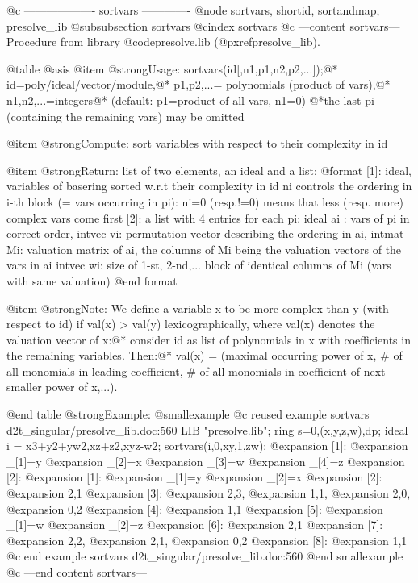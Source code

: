 @c ------------------- sortvars -------------
@node sortvars, shortid, sortandmap, presolve_lib
@subsubsection sortvars
@cindex sortvars
@c ---content sortvars---
Procedure from library @code{presolve.lib} (@pxref{presolve_lib}).

@table @asis
@item @strong{Usage:}
sortvars(id[,n1,p1,n2,p2,...]);@*
id=poly/ideal/vector/module,@*
p1,p2,...= polynomials (product of vars),@*
n1,n2,...=integers@*
(default: p1=product of all vars, n1=0)
@*the last pi (containing the remaining vars) may be omitted

@item @strong{Compute:}
sort variables with respect to their complexity in id

@item @strong{Return:}
list of two elements, an ideal and a list:
  @format
  [1]: ideal, variables of basering sorted w.r.t their complexity in id
       ni controls the ordering in i-th block (= vars occurring in pi):
       ni=0 (resp.!=0) means that less (resp. more) complex vars come first
  [2]: a list with 4 entries for each pi:
       ideal ai : vars of pi in correct order,
       intvec vi: permutation vector describing the ordering in ai,
       intmat Mi: valuation matrix of ai, the columns of Mi being the
                  valuation vectors of the vars in ai
       intvec wi: size of 1-st, 2-nd,... block of identical columns of Mi
                  (vars with same valuation)
  @end format

@item @strong{Note:}
We define a variable x to be more complex than y (with respect to id)
if val(x) > val(y) lexicographically, where val(x) denotes the
valuation vector of x:@*
consider id as list of polynomials in x with coefficients in the
remaining variables. Then:@*
val(x) = (maximal occurring power of x, # of all monomials in leading
coefficient, # of all monomials in coefficient of next smaller power
of x,...).

@end table
@strong{Example:}
@smallexample
@c reused example sortvars d2t_singular/presolve_lib.doc:560 
LIB "presolve.lib";
ring s=0,(x,y,z,w),dp;
ideal i = x3+y2+yw2,xz+z2,xyz-w2;
sortvars(i,0,xy,1,zw);
@expansion{} [1]:
@expansion{}    _[1]=y
@expansion{}    _[2]=x
@expansion{}    _[3]=w
@expansion{}    _[4]=z
@expansion{} [2]:
@expansion{}    [1]:
@expansion{}       _[1]=y
@expansion{}       _[2]=x
@expansion{}    [2]:
@expansion{}       2,1
@expansion{}    [3]:
@expansion{}       2,3,
@expansion{}       1,1,
@expansion{}       2,0,
@expansion{}       0,2 
@expansion{}    [4]:
@expansion{}       1,1
@expansion{}    [5]:
@expansion{}       _[1]=w
@expansion{}       _[2]=z
@expansion{}    [6]:
@expansion{}       2,1
@expansion{}    [7]:
@expansion{}       2,2,
@expansion{}       2,1,
@expansion{}       0,2 
@expansion{}    [8]:
@expansion{}       1,1
@c end example sortvars d2t_singular/presolve_lib.doc:560
@end smallexample
@c ---end content sortvars---

